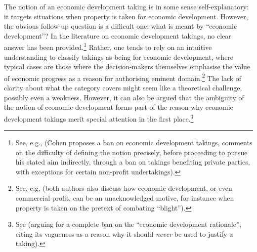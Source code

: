 The notion of an economic development taking is in some sense self-explanatory: it targets situations when property is taken for economic development. However, the obvious follow-up question is a difficult one: what is meant by ``economic development''? In the literature on economic development takings, no clear answer has been provided.\footnote{See, e.g., \cite[558-567]{cohen06} (Cohen proposes a ban on economic development takings, comments on the difficulty of defining the notion precisely, before proceeding to pursue his stated aim indirectly, through a ban on takings benefiting private parties, with exceptions for certain non-profit undertakings).} Rather, one tends to rely on an intuitive understanding to classify takings as being for economic development, where typical cases are those where the decision-makers themselves emphasise the value of economic progress as a reason for authorising eminent domain.\footnote{See, e.g, \cite{somin07,ely09} (both authors also discuss how economic development, or even commercial profit, can be an unacknowledged motive, for instance when property is taken on the pretext of combating ``blight'').} The lack of clarity about what the category covers might seem like a theoretical challenge, possibly even a weakness. However, it can also be argued that the ambiguity of the notion of economic development forms part of the reason why economic development takings merit special attention in the first place.\footnote{See \cite{somin07} (arguing for a complete ban on the ``economic development rationale'', citing its vagueness as a reason why it should {\it never} be used to justify a taking).} 


